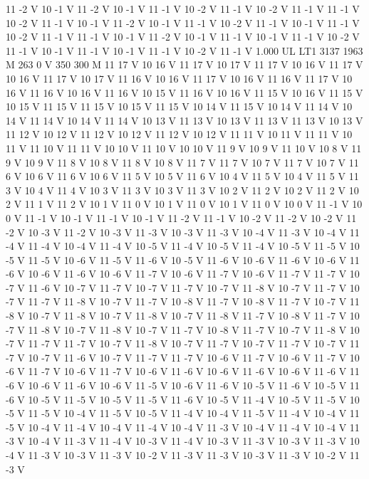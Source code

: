 {11 -2 V
10 -1 V
11 -2 V
10 -1 V
11 -1 V
10 -2 V
11 -1 V
10 -2 V
11 -1 V
11 -1 V
10 -2 V
11 -1 V
10 -1 V
11 -2 V
10 -1 V
11 -1 V
10 -2 V
11 -1 V
10 -1 V
11 -1 V
10 -2 V
11 -1 V
11 -1 V
10 -1 V
11 -2 V
10 -1 V
11 -1 V
10 -1 V
11 -1 V
10 -2 V
11 -1 V
10 -1 V
11 -1 V
10 -1 V
11 -1 V
10 -2 V
11 -1 V
1.000 UL
LT1
3137 1963 M
263 0 V
350 300 M
11 17 V
10 16 V
11 17 V
10 17 V
11 17 V
10 16 V
11 17 V
10 16 V
11 17 V
10 17 V
11 16 V
10 16 V
11 17 V
10 16 V
11 16 V
11 17 V
10 16 V
11 16 V
10 16 V
11 16 V
10 15 V
11 16 V
10 16 V
11 15 V
10 16 V
11 15 V
10 15 V
11 15 V
11 15 V
10 15 V
11 15 V
10 14 V
11 15 V
10 14 V
11 14 V
10 14 V
11 14 V
10 14 V
11 14 V
10 13 V
11 13 V
10 13 V
11 13 V
11 13 V
10 13 V
11 12 V
10 12 V
11 12 V
10 12 V
11 12 V
10 12 V
11 11 V
10 11 V
11 11 V
10 11 V
11 10 V
11 11 V
10 10 V
11 10 V
10 10 V
11 9 V
10 9 V
11 10 V
10 8 V
11 9 V
10 9 V
11 8 V
10 8 V
11 8 V
10 8 V
11 7 V
11 7 V
10 7 V
11 7 V
10 7 V
11 6 V
10 6 V
11 6 V
10 6 V
11 5 V
10 5 V
11 6 V
10 4 V
11 5 V
10 4 V
11 5 V
11 3 V
10 4 V
11 4 V
10 3 V
11 3 V
10 3 V
11 3 V
10 2 V
11 2 V
10 2 V
11 2 V
10 2 V
11 1 V
11 2 V
10 1 V
11 0 V
10 1 V
11 0 V
10 1 V
11 0 V
10 0 V
11 -1 V
10 0 V
11 -1 V
10 -1 V
11 -1 V
10 -1 V
11 -2 V
11 -1 V
10 -2 V
11 -2 V
10 -2 V
11 -2 V
10 -3 V
11 -2 V
10 -3 V
11 -3 V
10 -3 V
11 -3 V
10 -4 V
11 -3 V
10 -4 V
11 -4 V
11 -4 V
10 -4 V
11 -4 V
10 -5 V
11 -4 V
10 -5 V
11 -4 V
10 -5 V
11 -5 V
10 -5 V
11 -5 V
10 -6 V
11 -5 V
11 -6 V
10 -5 V
11 -6 V
10 -6 V
11 -6 V
10 -6 V
11 -6 V
10 -6 V
11 -6 V
10 -6 V
11 -7 V
10 -6 V
11 -7 V
10 -6 V
11 -7 V
11 -7 V
10 -7 V
11 -6 V
10 -7 V
11 -7 V
10 -7 V
11 -7 V
10 -7 V
11 -8 V
10 -7 V
11 -7 V
10 -7 V
11 -7 V
11 -8 V
10 -7 V
11 -7 V
10 -8 V
11 -7 V
10 -8 V
11 -7 V
10 -7 V
11 -8 V
10 -7 V
11 -8 V
10 -7 V
11 -8 V
10 -7 V
11 -8 V
11 -7 V
10 -8 V
11 -7 V
10 -7 V
11 -8 V
10 -7 V
11 -8 V
10 -7 V
11 -7 V
10 -8 V
11 -7 V
10 -7 V
11 -8 V
10 -7 V
11 -7 V
11 -7 V
10 -7 V
11 -8 V
10 -7 V
11 -7 V
10 -7 V
11 -7 V
10 -7 V
11 -7 V
10 -7 V
11 -6 V
10 -7 V
11 -7 V
11 -7 V
10 -6 V
11 -7 V
10 -6 V
11 -7 V
10 -6 V
11 -7 V
10 -6 V
11 -7 V
10 -6 V
11 -6 V
10 -6 V
11 -6 V
10 -6 V
11 -6 V
11 -6 V
10 -6 V
11 -6 V
10 -6 V
11 -5 V
10 -6 V
11 -6 V
10 -5 V
11 -6 V
10 -5 V
11 -6 V
10 -5 V
11 -5 V
10 -5 V
11 -5 V
11 -6 V
10 -5 V
11 -4 V
10 -5 V
11 -5 V
10 -5 V
11 -5 V
10 -4 V
11 -5 V
10 -5 V
11 -4 V
10 -4 V
11 -5 V
11 -4 V
10 -4 V
11 -5 V
10 -4 V
11 -4 V
10 -4 V
11 -4 V
10 -4 V
11 -3 V
10 -4 V
11 -4 V
10 -4 V
11 -3 V
10 -4 V
11 -3 V
11 -4 V
10 -3 V
11 -4 V
10 -3 V
11 -3 V
10 -3 V
11 -3 V
10 -4 V
11 -3 V
10 -3 V
11 -3 V
10 -2 V
11 -3 V
11 -3 V
10 -3 V
11 -3 V
10 -2 V
11 -3 V
}

